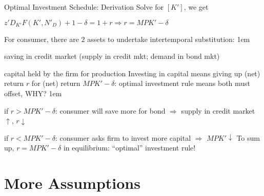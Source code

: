 \documentclass[11pt,aspectratio=43]{beamer}
\let\olditemize=\itemize
\let\endolditemize=\enditemize
\renewenvironment{itemize}{\olditemize \itemsep1em}{\endolditemize}
\let\oldenumerate=\enumerate
\let\endoldenumerate=\endenumerate
\renewenvironment{enumerate}{\oldenumerate \itemsep1em}{ \endoldenumerate}
\theoremstyle{definition}
\begin{document}
\begin{frame}{Optimal Investment Schedule: Derivation}
\label{slide:Optimal_Investment_Schedule__Derivation}
    Solve for $ [ K' ] $, we get
    \begin{center}
        $ \displaystyle z' D_{K'} F( K', N'_{D} ) + 1 - \delta = 1+r \Rightarrow r = MPK' - \delta $
    \end{center}
    For consumer, there are $ 2 $ assets to undertake \alert{intertemporal substitution}:
    \begin{enumerate}
        \item saving in credit market (supply in credit mkt; demand in bond mkt)
        \item capital held by the firm for production
    \end{enumerate}
    Investing in capital means giving up (net) return $ r $ for (net) return $ MPK' - \delta $: \alert{optimal investment rule means both must offset, WHY?}
    \begin{itemize}
        \item if $ r > MPK' - \delta $: consumer will save more for bond $ \Rightarrow $ supply in credit market  $ \uparrow  $, $ r \downarrow  $
        \item if $ r < MPK' - \delta $: consumer asks firm to invest more capital $ \Rightarrow  $ $ MPK' \downarrow  $
    \end{itemize}
    To sum up, $ r = MPK' - \delta $ in equilibrium: ``optimal'' investment rule!

\end{frame}

\section{More Assumptions}
\label{sec:More_Assumptions}
\end{document}

